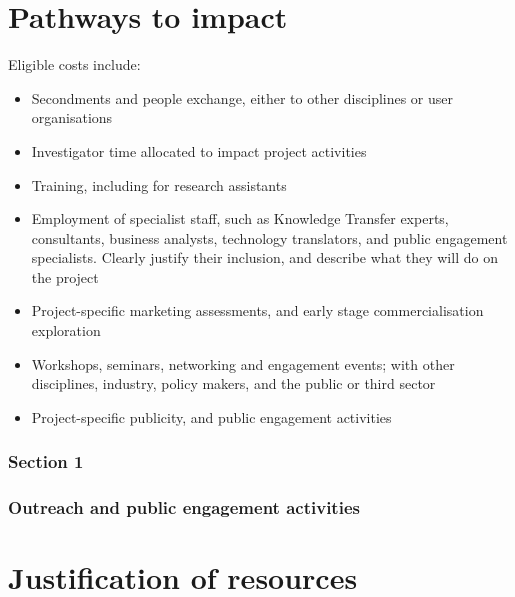 \documentclass{epsrc}
\begin{document}
\clearpage
\part{Pathways to impact}
Eligible costs include:
\begin{itemize}
\item Secondments and people exchange, either to other disciplines or user organisations
\item Investigator time allocated to impact project activities
\item Training, including for research assistants
\item Employment of specialist staff, such as Knowledge Transfer experts, consultants, business analysts, technology translators, and public engagement specialists. Clearly justify their inclusion, and describe what they will do on the project
\item Project-specific marketing assessments, and early stage commercialisation exploration
\item Workshops, seminars, networking and engagement events; with other disciplines, industry, policy makers, and the public or third sector
\item Project-specific publicity, and public engagement activities
\end{itemize}

\section{Section 1}
\section{Outreach and public engagement activities}



\clearpage
\part{Justification of resources}
\end{document}
